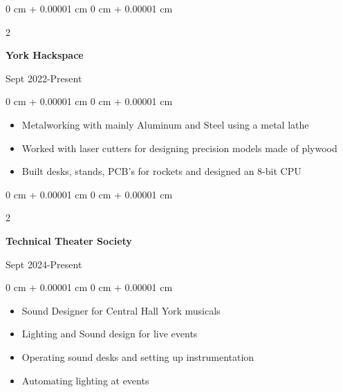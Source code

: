 \documentclass[10pt, letterpaper]{article}
\newenvironment{onecolentry}{
    \begin{adjustwidth}{
        0 cm + 0.00001 cm
    }{
        0 cm + 0.00001 cm
    }
}{
    \end{adjustwidth}
} %
\newenvironment{twocolentry}[2][]{
    \onecolentry
    \def\secondColumn{#2}
    \setcolumnwidth{\fill, 4.5 cm}
    \begin{paracol}{2}
}{
    \switchcolumn \raggedleft \secondColumn
    \end{paracol}
    \endonecolentry
} %
\begin{document}
\begin{samepage}
        \vspace{0.10 cm}
        
        \begin{twocolentry}{
                Sept 2022-Present
            }
                \textbf{York Hackspace}

                \vspace{0.10 cm}
            \end{twocolentry}


            \vspace{0.10 cm}

            \begin{onecolentry}
                \begin{itemize}
                    \item Metalworking with mainly Aluminum and Steel using a metal lathe
                    \item Worked with laser cutters for designing precision models made of plywood
                    \item Built desks, stands, PCB's for rockets and designed an 8-bit CPU
                \end{itemize}
            \end{onecolentry}
        
         \begin{twocolentry}{
              Sept 2024-Present
            }
                \textbf{Technical Theater Society}

                \vspace{0.10 cm}
            \end{twocolentry}


            \vspace{0.10 cm}

            \begin{onecolentry}
                \begin{itemize}
                    \item Sound Designer for Central Hall York musicals
                    \item Lighting and Sound design for live events
                    \item Operating sound desks and setting up instrumentation
                    \item Automating lighting at events 
                \end{itemize}
            \end{onecolentry}


\end{samepage}
\end{document}
